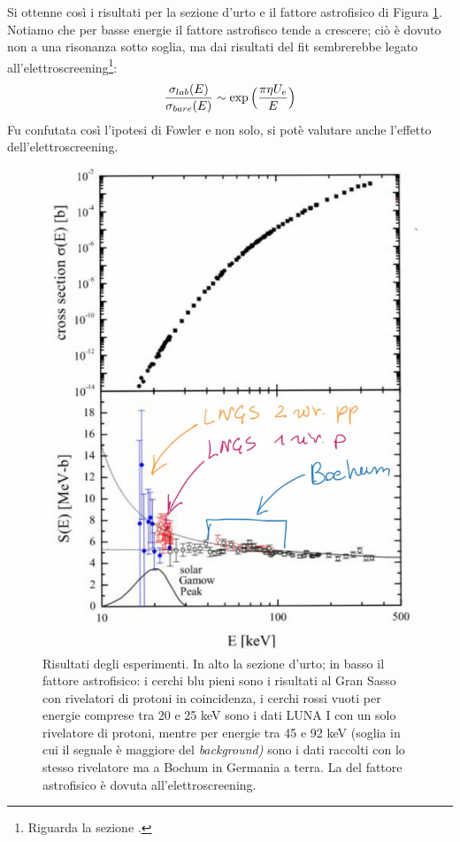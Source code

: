 \noindent Si ottenne così i risultati per la sezione d'urto e il fattore astrofisico di Figura \ref{0415_sigma}. Notiamo che per basse energie il fattore astrofisco tende a crescere; ciò è dovuto non a una risonanza sotto soglia, ma dai risultati del fit sembrerebbe legato all'elettroscreening\footnote{Riguarda la sezione .}:
$$\frac{\sigma_{lab} (E)}{\sigma_{bare} (E)} \sim \exp{\Bigl ( \frac{\pi\eta U_e}{E} \Bigr )}$$
Fu confutata così l'ipotesi di Fowler e non solo, si potè valutare anche l'effetto dell'elettroscreening.

\begin{figure}[!h]
	\centering
	\includegraphics[scale=0.5]{Immagini/0415_sigma.png}
	\caption{Risultati degli esperimenti. In alto la sezione d'urto; in basso il fattore astrofisico: i cerchi blu pieni sono i risultati al Gran Sasso con rivelatori di protoni in coincidenza, i cerchi rossi vuoti per energie comprese tra 20 e 25 keV sono i dati LUNA I con un solo rivelatore di protoni, mentre per energie tra 45 e 92 keV (soglia in cui il segnale è maggiore del \textit{background)} sono i dati raccolti con lo stesso rivelatore ma a Bochum in Germania a terra. La  del fattore astrofisico è dovuta all'elettroscreening.}
	\label{0415_sigma}
\end{figure}

